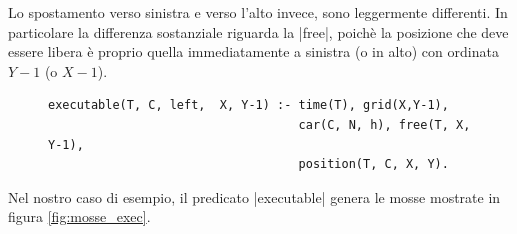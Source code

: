 \documentclass[10pt, a4paper, oneside]{article}
\begin{document}
\noindent
Lo spostamento verso sinistra e verso l'alto invece, sono leggermente differenti. In particolare la differenza sostanziale riguarda la |free|, poichè la posizione che deve essere libera è proprio quella immediatamente a sinistra (o in alto) con ordinata $Y-1$ (o $X-1$).

\begin{figure}[H]
\centering
\begin{verbatim}
executable(T, C, left,  X, Y-1) :- time(T), grid(X,Y-1), 
                                   car(C, N, h), free(T, X, Y-1), 
                                   position(T, C, X, Y).
\end{verbatim}
\end{figure}


\noindent
Nel nostro caso di esempio, il predicato |executable| genera le mosse mostrate in figura \ref{fig:mosse_exec}.
\end{document}
